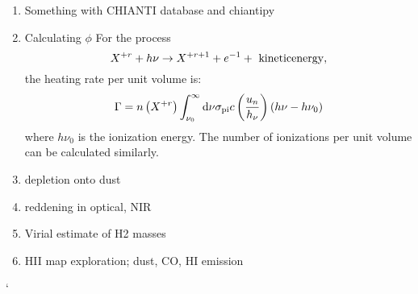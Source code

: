\begin{enumerate}
\item Something with CHIANTI database and chiantipy
\item Calculating $\phi$
For the process
\begin{equation}
X^{+r} + h\nu \rightarrow X^{+r +1} + e^{-1} + {\rm ~kinetic energy},
\end{equation}
the heating rate per unit volume is:
\begin{equation}
\Gamma = n\left(X^{+r}\right)  \int_{\nu_0}^\infty {\rm
d}\nu \sigma_{\rm pi} c \left(\frac{u_n}{h_\nu} \right)
(h\nu - h \nu_0)
\end{equation}
where $h\nu_0$ is the ionization energy. The number of ionizations
per unit volume can be calculated similarly.
\item depletion onto dust
\item reddening  in optical, NIR
\item Virial estimate of H2 masses
\item HII map exploration; dust, CO, HI emission
\end{enumerate}`


  
